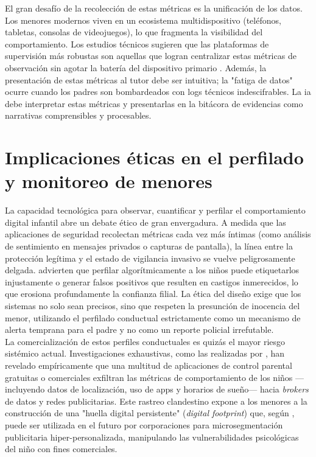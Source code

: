 El gran desafío de la recolección de estas métricas es la unificación de los datos. Los menores modernos viven en un ecosistema multidispositivo (teléfonos, tabletas, consolas de videojuegos), lo que fragmenta la visibilidad del comportamiento. Los estudios técnicos sugieren que las plataformas de supervisión más robustas son aquellas que logran centralizar estas métricas de observación sin agotar la batería del dispositivo primario \cite{koulaxidis_improving_2022}. Además, la presentación de estas métricas al tutor debe ser intuitiva; la "fatiga de datos" ocurre cuando los padres son bombardeados con logs técnicos indescifrables. La \gls{ia} debe interpretar estas métricas y presentarlas en la bitácora de evidencias como narrativas comprensibles y procesables.\\

\section{Implicaciones éticas en el perfilado y monitoreo de menores}

La capacidad tecnológica para observar, cuantificar y perfilar el comportamiento digital infantil abre un debate ético de gran envergadura. A medida que las aplicaciones de seguridad recolectan métricas cada vez más íntimas (como análisis de sentimiento en mensajes privados o capturas de pantalla), la línea entre la protección legítima y el estado de vigilancia invasivo se vuelve peligrosamente delgada. \cite{agbana_ethical_2025} advierten que perfilar algorítmicamente a los niños puede etiquetarlos injustamente o generar falsos positivos que resulten en castigos inmerecidos, lo que erosiona profundamente la confianza filial. La ética del diseño exige que los sistemas no solo sean precisos, sino que respeten la presunción de inocencia del menor, utilizando el perfilado conductual estrictamente como un mecanismo de alerta temprana para el padre y no como un reporte policial irrefutable.\\

La comercialización de estos perfiles conductuales es quizás el mayor riesgo sistémico actual. Investigaciones exhaustivas, como las realizadas por \cite{feal_angel_2020}, han revelado empíricamente que una multitud de aplicaciones de control parental gratuitas o comerciales exfiltran las métricas de comportamiento de los niños —incluyendo datos de localización, uso de apps y horarios de sueño— hacia \textit{brokers} de datos y redes publicitarias. Este rastreo clandestino expone a los menores a la construcción de una "huella digital persistente" (\textit{digital footprint}) que, según \cite{tintori_childrens_2023}, puede ser utilizada en el futuro por corporaciones para microsegmentación publicitaria hiper-personalizada, manipulando las vulnerabilidades psicológicas del niño con fines comerciales. \\



